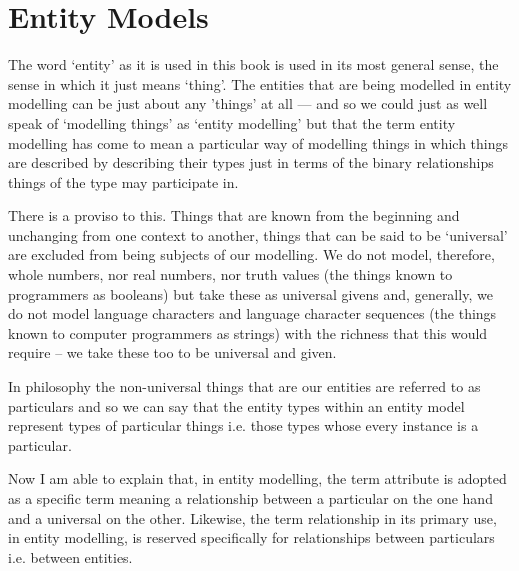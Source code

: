 

\section{Entity Models}

\mynote The word `entity' as it is used in this book is used in its most general sense,  the sense in which it just means `thing'. The entities that are being modelled in entity modelling can be just about any 'things' at all --- and so we could just as well speak of `modelling things' as `entity modelling' but that the term entity modelling
has come to mean a particular way of modelling things in which things are described by describing their types just in terms of the binary relationships things of the type may participate in.

\mynote There is a proviso to this. 
Things that are known from the beginning and unchanging from one context to another, things that can be said to be `universal' are excluded from being subjects of our modelling. We do not model, therefore, whole numbers, nor real numbers, nor truth values (the things known to programmers as booleans) but take these as universal givens and, generally, we do not model language characters and language character sequences (the things known to computer programmers as strings) with the richness that this would require -- we take these too to be universal and given. 

\mynote In philosophy the non-universal things that are our entities are referred to as particulars and so we can say that the entity types within an entity model represent types of particular things i.e. those types whose every instance is a particular.  

\mynote Now I am able to explain that, in entity modelling, the term attribute is adopted as a specific term meaning a relationship between a particular on the one hand and a universal on the other. Likewise, the term relationship 
in its primary use, in entity modelling, is reserved specifically for relationships between particulars i.e. between entities. 

